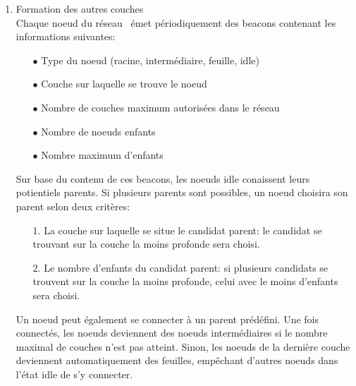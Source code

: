 \begin{enumerate}
            \item Formation des autres couches\\
                Chaque noeud du réseau \espmesh\ émet périodiquement des beacons contenant les
                informations suivantes:
                \begin{itemize}
                    \item[$\bullet$] Type du noeud (racine, intermédiaire, feuille, idle)
                    \item[$\bullet$] Couche sur laquelle se trouve le noeud
                    \item[$\bullet$] Nombre de couches maximum autorisées dans le réseau
                    \item[$\bullet$] Nombre de noeuds enfants
                    \item[$\bullet$] Nombre maximum d'enfants   
                \end{itemize}
                Sur base du contenu de ces beacons, les noeuds idle conaissent leurs potientiels parents.
                Si plusieurs parents sont possibles, un noeud choisira son parent selon deux critères:
                \begin{enumerate}
                    \addtolength{\itemindent}{1cm}
                    \item[1.] La couche sur laquelle se situe le candidat parent:
                        le candidat se trouvant sur la couche la moins profonde sera choisi. 
                    \item[2.] Le nombre d'enfants du candidat parent: si plusieurs candidats se trouvent
                        sur la couche la moins profonde, celui avec le moins d'enfants sera choisi. 
                \end{enumerate}
                
                Un noeud peut également se connecter à un parent prédéfini.
                Une fois connectés, les noeuds deviennent des noeuds intermédiaires si le nombre maximal de couches n'est pas atteint.
                Sinon, les noeuds de la dernière couche deviennent automatiquement
                des feuilles, empêchant d'autres noeuds dans l'état idle de s'y connecter.

        \end{enumerate}
